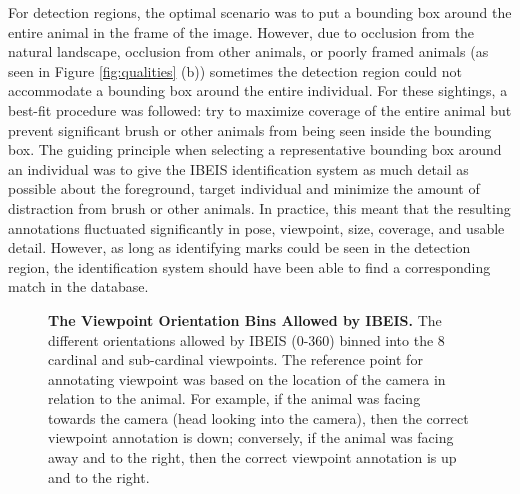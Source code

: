 For detection regions, the optimal scenario was to put a bounding box around the entire animal in the frame of the image.  However, due to occlusion from the natural landscape, occlusion from other animals, or poorly framed animals (as seen in Figure \ref{fig:qualities} (b)) sometimes the detection region could not accommodate a bounding box around the entire individual.  For these sightings, a best-fit procedure was followed: try to maximize coverage of the entire animal but prevent significant brush or other animals from being seen inside the bounding box.  The guiding principle when selecting a representative bounding box around an individual was to give the IBEIS identification system as much detail as possible about the foreground, target individual and minimize the amount of distraction from brush or other animals.  In practice, this meant that the resulting annotations fluctuated significantly in pose, viewpoint, size, coverage, and usable detail.  However, as long as identifying marks could be seen in the detection region, the identification system should have been able to find a corresponding match in the database.

\begin{figure}[t]%
    \centering
        \caption[The Viewpoint Orientation Bins Allowed by IBEIS]{\textbf{The Viewpoint Orientation Bins Allowed by IBEIS.}  The different orientations allowed by IBEIS (0-360) binned into the 8 cardinal and sub-cardinal viewpoints.  The reference point for annotating viewpoint was based on the location of the camera in relation to the animal.  For example, if the animal was facing towards the camera (head looking into the camera), then the correct viewpoint annotation is down; conversely, if the animal was facing away and to the right, then the correct viewpoint annotation is up and to the right.}
        \label{fig:viewpoint}
\end{figure}

